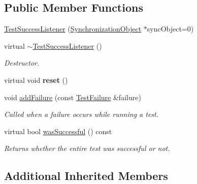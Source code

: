 \subsection*{Public Member Functions}
\begin{DoxyCompactItemize}
\item 
\hyperlink{class_test_success_listener_a88e82abf23a0563e345e0883d132f267}{Test\+Success\+Listener} (\hyperlink{class_synchronized_object_1_1_synchronization_object}{Synchronization\+Object} $\ast$sync\+Object=0)
\item 
virtual \hyperlink{class_test_success_listener_a0d51db5b1bfc10a479563244d6dcd98c}{$\sim$\+Test\+Success\+Listener} ()\hypertarget{class_test_success_listener_a0d51db5b1bfc10a479563244d6dcd98c}{}\label{class_test_success_listener_a0d51db5b1bfc10a479563244d6dcd98c}

\begin{DoxyCompactList}\small\item\em Destructor. \end{DoxyCompactList}\item 
virtual void {\bfseries reset} ()\hypertarget{class_test_success_listener_aa6172d9c318a9a0fdb789b7668550290}{}\label{class_test_success_listener_aa6172d9c318a9a0fdb789b7668550290}

\item 
void \hyperlink{class_test_success_listener_a912bb5ea408b2be5b39cfb45e1bb402f}{add\+Failure} (const \hyperlink{class_test_failure}{Test\+Failure} \&failure)
\begin{DoxyCompactList}\small\item\em Called when a failure occurs while running a test. \end{DoxyCompactList}\item 
virtual bool \hyperlink{class_test_success_listener_aa33c3787a9251216c2ed4a865b4d4249}{was\+Successful} () const \hypertarget{class_test_success_listener_aa33c3787a9251216c2ed4a865b4d4249}{}\label{class_test_success_listener_aa33c3787a9251216c2ed4a865b4d4249}

\begin{DoxyCompactList}\small\item\em Returns whether the entire test was successful or not. \end{DoxyCompactList}\end{DoxyCompactItemize}
\subsection*{Additional Inherited Members}


